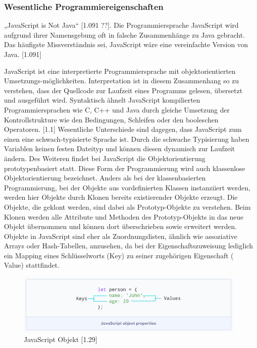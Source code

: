 \subsubsection{Wesentliche Programmiereigenschaften}
„JavaScript is Not Java“ [1.091 ??]. Die Programmiersprache JavaScript wird aufgrund ihrer Namensgebung oft in falsche Zusammenhänge zu Java gebracht. Das häufigste Missverständnis sei, JavaScript wäre eine vereinfachte Version von Java. [1.091]
\newline

JavaScript ist eine interpretierte Programmiersprache mit objektorientierten Umsetzungs-möglichkeiten. Interpretation ist in diesem Zusammenhang so zu verstehen, dass der Quellcode zur Laufzeit eines Programms gelesen, übersetzt und ausgeführt wird.
Syntaktisch ähnelt JavaScript kompilierten Programmiersprachen wie C, C++ und Java durch gleiche Umsetzung der Kontrollstrukture wie den Bedingungen, Schleifen oder den booleschen Operatoren. [1.1] Wesentliche Unterschiede sind dagegen, dass JavaScript zum einen eine schwach-typisierte Sprache ist. Durch die schwache Typisierung haben Variablen keinen festen Dateityp und können diesen dynamisch zur Laufzeit ändern. Des Weiteren findet bei JavaScript die Objektorientierung prototypenbasiert statt. Diese Form der Programmierung wird auch klassenlose Objektorientierung bezeichnet. Anders als bei der klassenbasierten Programmierung, bei der Objekte aus vor\-de\-fi\-niert\-en Klassen instanziiert werden, werden hier Objekte durch Klonen bereits existierender Objekte erzeugt. Die Objekte, die geklont werden, sind dabei als Prototyp-Objekte zu ver\-steh\-en. Beim Klonen werden alle Attribute und Methoden des Prototyp-Objekts in das neue Objekt übernommen und können dort überschrieben sowie erweitert werden. Objekte in JavaScript sind eher als Zuordnungslisten, ähnlich wie assoziative Arrays oder Hash-Tabellen, anzusehen, da bei der Eigenschaftszuweisung lediglich ein Mapping eines Schlüsselworts (Key) zu seiner zugehörigen Eigenschaft ( Value) stattfindet.
\newline

\begin{figure}[h]
\centering
\includegraphics[width=\textwidth]{images/JavaScript_Object.PNG}
\caption{JavaScript Objekt [1.29]}
\end{figure}



